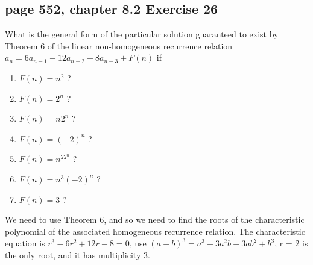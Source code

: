 \documentclass[sigconf]{acmart}
\begin{document}
\subsection{page 552, chapter 8.2 Exercise 26}
\begin{shaded}
    What is the general form of the particular solution guaranteed to exist by Theorem 6 of the linear non-homogeneous recurrence relation $a_n = 6a_{n-1} - 12a_{n-2} + 8a_{n-3} + F(n)$ if
    \begin{enumerate}[label=(\alph*)]
        \item $F(n) = n^2$ ?
        \item $F(n) = 2^n$ ?
        \item $F(n) = n2^n$ ?
        \item $F(n) = (-2)^n$ ?
        \item $F(n) = n^22^n$ ?
        \item $F(n) = n^3(-2)^n$ ?
        \item $F(n) = 3$ ?
    \end{enumerate}
\end{shaded}
We need to use Theorem 6, and so we need to find the roots of the characteristic polynomial of the associated homogeneous recurrence relation. The characteristic equation is $r^3 - 6r^2 + 12r - 8 = 0$, use $(a+b)^3 = a^3 + 3a^2b + 3ab^2 + b^3$, r = 2 is the only root, and it has multiplicity 3. 
\end{document}
